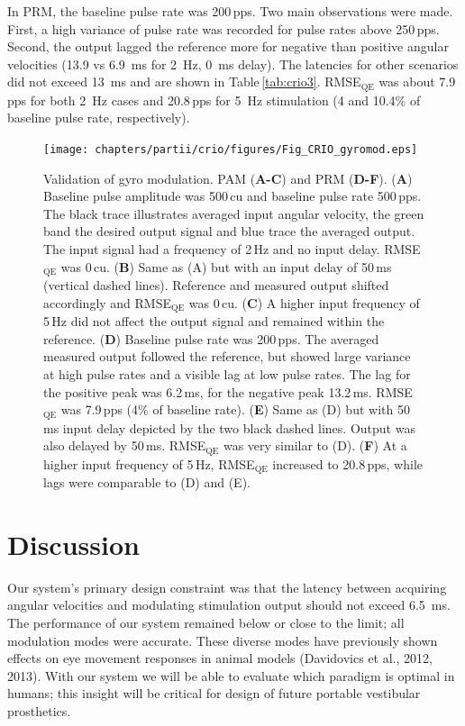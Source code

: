 In PRM, the baseline pulse rate was 200\,pps. Two main observations were made. First, a high variance of pulse rate was recorded for pulse rates above 250\,pps. Second, the output lagged the reference more for negative than positive angular velocities (13.9 vs \SI{6.9}{\milli\second} for \SI{2}{\hertz}, \SI{0}{\milli\second} delay). The latencies for other scenarios did not exceed \SI{13}{\milli\second} and are shown in Table\,\ref{tab:crio3}. RMSE$_{\text{QE}}$ was about 7.9\,pps for both \SI{2}{\hertz} cases and 20.8\,pps for \SI{5}{\hertz} stimulation (4 and 10.4\% of baseline pulse rate, respectively).

\begin{figure}[btp]
\centering
\texttt{[image: chapters/partii/crio/figures/Fig\_CRIO\_gyromod.eps]} 
\caption[CompactRIO gyroscope modulation]{Validation of gyro modulation. PAM (\textbf{A-C}) and PRM (\textbf{D-F}). (\textbf{A}) Baseline pulse amplitude was 500\,cu and baseline pulse rate 500\,pps. The black trace illustrates averaged input angular velocity, the green band the desired output signal and blue trace the averaged output. The input signal had a frequency of 2\,Hz and no input delay. RMSE$_{\text{QE}}$ was 0\,cu. (\textbf{B}) Same as (A) but with an input delay of 50\,ms (vertical dashed lines). Reference and measured output shifted accordingly and RMSE$_{\text{QE}}$ was 0\,cu. (\textbf{C}) A higher input frequency of 5\,Hz did not affect the output signal and remained within the reference. (\textbf{D}) Baseline pulse rate was 200\,pps. The averaged measured output followed the reference, but showed large variance at high pulse rates and a visible lag at low pulse rates. The lag for the positive peak was 6.2\,ms, for the negative peak 13.2\,ms. RMSE$_{\text{QE}}$ was 7.9\,pps (4\% of baseline rate). (\textbf{E}) Same as (D) but with 50 ms input delay depicted by the two black dashed lines. Output was also delayed by 50\,ms. RMSE$_{\text{QE}}$ was very similar to (D). (\textbf{F}) At a higher input frequency of 5\,Hz, RMSE$_{\text{QE}}$ increased to 20.8\,pps, while lags were comparable to (D) and (E).}
\label{fig:crio:gyromod}
\end{figure}

\section{Discussion}
Our system's primary design constraint was that the latency between acquiring angular velocities and modulating stimulation output should not exceed \SI{6.5}{\milli\second}.	The performance of our system remained below or close to the limit; all modulation modes were accurate. These diverse modes have previously shown effects on eye movement responses in animal models (Davidovics et al., 2012, 2013). With our system we will be able to evaluate which paradigm is optimal in humans; this insight will be critical for design of future portable vestibular prosthetics.

